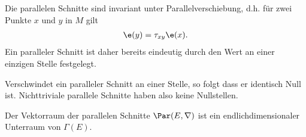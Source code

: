 \documentclass[%
	paper=a5,%
	fleqn,%
	DIV=18,%
	BCOR=0mm,
	fontsize=11pt,
	titlepage=false,%
	bibliography=totoc,
	DIV=18,%
	twoside=true,
	pdftitle=Riemannsche Geometrie,
	pdfauthor=Uwe Semmelmann,
	numbers=noendperiod]%
	{scrbook}
\begin{document}
\begin{rem}[Bemerkungen.]
\begin{remenum}
\item Die parallelen Schnitte sind invariant unter Parallelverschiebung, d.h. für zwei Punkte $x$ und $y$ in $M$ gilt
\begin{align*}
\e(y) = \tau_{xy}\e(x).
\end{align*}
Ein paralleler Schnitt ist daher bereits eindeutig durch den Wert an einer einzigen Stelle festgelegt.
\item
Verschwindet ein paralleler Schnitt an einer Stelle, so folgt dass er identisch Null ist. Nichttriviale parallele Schnitte haben also keine Nullstellen.
\item Der Vektorraum der parallelen Schnitte $\Par(E,\nabla)$ ist ein endlichdimensionaler Unterraum von $\Gamma(E)$.\map
\end{remenum}
\end{rem}
\end{document}
